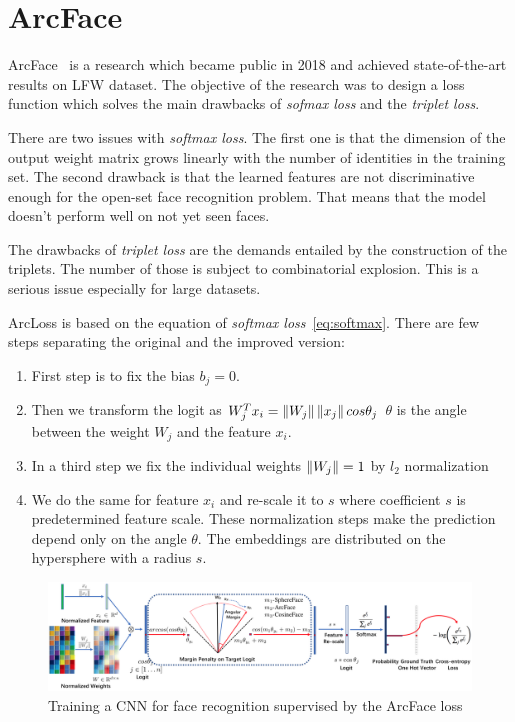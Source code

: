 \chapter{ArcFace}\label{ch:arcface}
ArcFace~\cite{ArcFace} is a research which became public in 2018 and achieved state-of-the-art results on LFW dataset.
The objective of the research was to design a loss function which solves the main drawbacks of \textit{sofmax loss}
and the \textit{triplet loss}.

There are two issues with \textit{softmax loss}.
The first one is that the dimension of the output weight matrix grows linearly with the number of identities in the
training set.
The second drawback is that the learned features are not discriminative enough for the open-set face recognition
problem.
That means that the model doesn't perform well on not yet seen faces.

The drawbacks of \textit{triplet loss} are the demands entailed by the construction of the triplets.
The number of those is subject to combinatorial explosion.
This is a serious issue especially for large datasets.

ArcLoss is based on the equation of \textit{softmax loss}~\ref{eq:softmax}.
There are few steps separating the original and the improved version:
\begin{enumerate}
    \item First step is to fix the bias $b_j = 0$.
    \item Then we transform the logit as $W_j^T x_i = \left\lVert W_j\right\rVert \left\lVert x_j\right\rVert cos \theta_j$
    $\theta$ is the angle between the weight $W_j$ and the feature $x_i$.
    \item In a third step we fix the individual weights $\left\lVert W_j\right\rVert = 1$ by $l_2$ normalization
    \item We do the same for feature $x_i$ and re-scale it to $s$ where coefficient $s$ is predetermined feature scale.
    These normalization steps make the prediction depend only on the angle $\theta$.
    The embeddings are distributed on the hypersphere with a radius $s$.
\end{enumerate}

\begin{figure}[H]
    \centering
    \includegraphics[width=\columnwidth]{images/arcface/arcface.png}
    \caption{Training a CNN for face recognition supervised by the ArcFace loss~\cite{ArcFace}}
    \label{fig:arcface}
\end{figure}